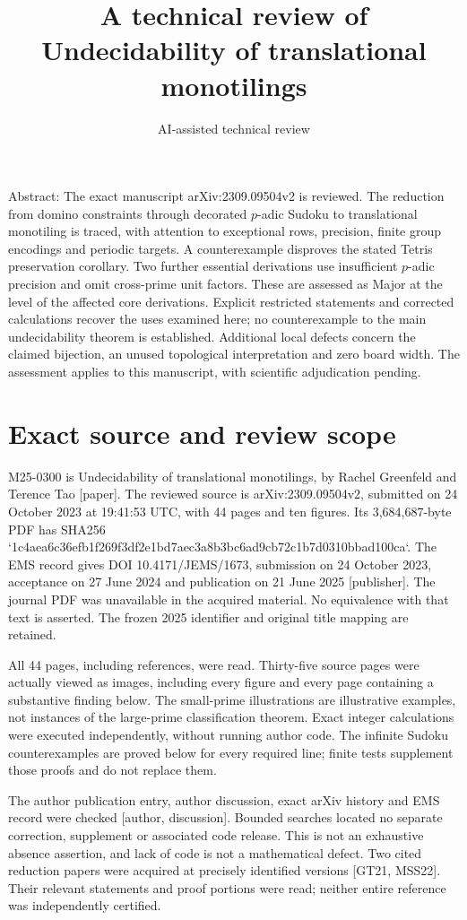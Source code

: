 \documentclass[10pt]{article}
\title{A technical review of
Undecidability of translational monotilings}
\author{AI-assisted technical review}
\date{}
\begin{document}
\maketitle
Abstract: The exact manuscript arXiv:2309.09504v2 is reviewed. The reduction from domino constraints through decorated \(p\)-adic Sudoku to translational monotiling is traced, with attention to exceptional rows, precision, finite group encodings and periodic targets. A counterexample disproves the stated Tetris preservation corollary. Two further essential derivations use insufficient \(p\)-adic precision and omit cross-prime unit factors. These are assessed as Major at the level of the affected core derivations. Explicit restricted statements and corrected calculations recover the uses examined here; no counterexample to the main undecidability theorem is established. Additional local defects concern the claimed bijection, an unused topological interpretation and zero board width. The assessment applies to this manuscript, with scientific adjudication pending.\par
\section*{Exact source and review scope}
M25-0300 is Undecidability of translational monotilings, by Rachel Greenfeld and Terence Tao [paper]. The reviewed source is arXiv:2309.09504v2, submitted on 24 October 2023 at 19:41:53 UTC, with 44 pages and ten figures. Its 3,684,687-byte PDF has SHA256 `1c4aea6c36efb1f269f3df2e1bd7aec3a8b3bc6ad9cb72c1b7d0310bbad100ca`. The EMS record gives DOI 10.4171/JEMS/1673, submission on 24 October 2023, acceptance on 27 June 2024 and publication on 21 June 2025 [publisher]. The journal PDF was unavailable in the acquired material. No equivalence with that text is asserted. The frozen 2025 identifier and original title mapping are retained.\par
All 44 pages, including references, were read. Thirty-five source pages were actually viewed as images, including every figure and every page containing a substantive finding below. The small-prime illustrations are illustrative examples, not instances of the large-prime classification theorem. Exact integer calculations were executed independently, without running author code. The infinite Sudoku counterexamples are proved below for every required line; finite tests supplement those proofs and do not replace them.\par
The author publication entry, author discussion, exact arXiv history and EMS record were checked [author, discussion]. Bounded searches located no separate correction, supplement or associated code release. This is not an exhaustive absence assertion, and lack of code is not a mathematical defect. Two cited reduction papers were acquired at precisely identified versions [GT21, MSS22]. Their relevant statements and proof portions were read; neither entire reference was independently certified.\par
\end{document}

